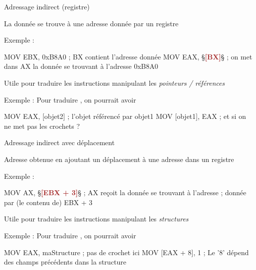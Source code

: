 \documentclass[14pt]{beamer}
\begin{document}
\begin{frame}[fragile]{Adressage indirect (registre)}

La donnée se trouve à une adresse donnée par un registre

\bigskip
Exemple :
\begin{Asm}
	MOV EBX, 0xB8A0 ; BX contient l'adresse donnée
	MOV EAX, §\textcolor{brown}{\textbf{[BX]}}§   ; on met dans AX la donnée se trouvant à l'adresse 0xB8A0
\end{Asm}

\bigskip
Utile pour traduire les instructions manipulant les \emph{pointeurs / références}

\bigskip
Exemple : Pour traduire , on pourrait avoir
\begin{Asm}
	MOV EAX, [objet2]      ; l'objet référencé par objet1
	MOV [objet1], EAX      ; et si on ne met pas les crochets ?
\end{Asm}
\end{frame}

\begin{frame}[fragile]{Adressage indirect avec déplacement}

Adresse obtenue en ajoutant un déplacement à une adresse dans un registre

\bigskip
Exemple :
\begin{Asm}
	MOV AX, §\textcolor{brown}{\textbf{[EBX + 3]}}§    ; AX reçoit la donnée se trouvant à l'adresse
	                      ; donnée par (le contenu de) EBX + 3
\end{Asm}

\bigskip
Utile pour traduire les instructions manipulant les \emph{structures}

\bigskip
Exemple : Pour traduire , on pourrait avoir
\begin{Asm}
	MOV EAX, maStructure  ; pas de crochet ici 
	MOV [EAX + 8], 1  ; Le '8' dépend des champs précédents dans la structure 
\end{Asm}
\end{frame}
\end{document}
